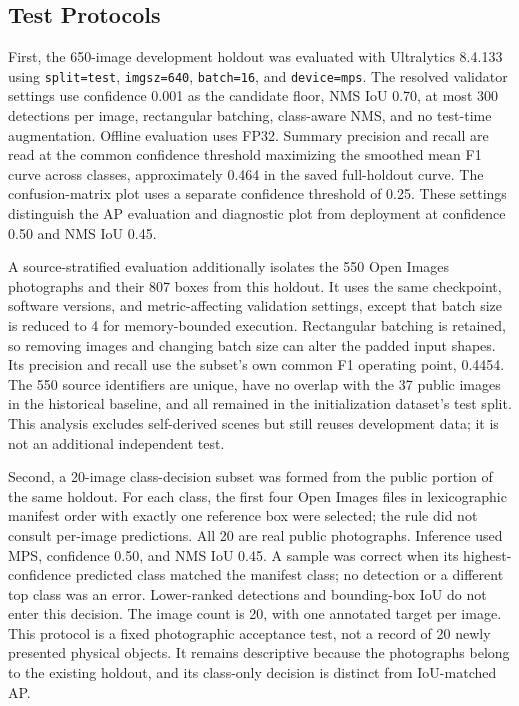\documentclass[12pt,a4paper]{article}
\begin{document}
\subsection{Test Protocols}

First, the 650-image development holdout was evaluated with Ultralytics 8.4.133 using \texttt{split=test}, \texttt{imgsz=640}, \texttt{batch=16}, and \texttt{device=mps}. The resolved validator settings use confidence 0.001 as the candidate floor, NMS IoU 0.70, at most 300 detections per image, rectangular batching, class-aware NMS, and no test-time augmentation. Offline evaluation uses FP32. Summary precision and recall are read at the common confidence threshold maximizing the smoothed mean F1 curve across classes, approximately 0.464 in the saved full-holdout curve. The confusion-matrix plot uses a separate confidence threshold of 0.25. These settings distinguish the AP evaluation and diagnostic plot from deployment at confidence 0.50 and NMS IoU 0.45.

A source-stratified evaluation additionally isolates the 550 Open Images photographs and their 807 boxes from this holdout. It uses the same checkpoint, software versions, and metric-affecting validation settings, except that batch size is reduced to 4 for memory-bounded execution. Rectangular batching is retained, so removing images and changing batch size can alter the padded input shapes. Its precision and recall use the subset's own common F1 operating point, 0.4454. The 550 source identifiers are unique, have no overlap with the 37 public images in the historical baseline, and all remained in the initialization dataset's test split. This analysis excludes self-derived scenes but still reuses development data; it is not an additional independent test.

Second, a 20-image class-decision subset was formed from the public portion of the same holdout. For each class, the first four Open Images files in lexicographic manifest order with exactly one reference box were selected; the rule did not consult per-image predictions. All 20 are real public photographs. Inference used MPS, confidence 0.50, and NMS IoU 0.45. A sample was correct when its highest-confidence predicted class matched the manifest class; no detection or a different top class was an error. Lower-ranked detections and bounding-box IoU do not enter this decision. The image count is 20, with one annotated target per image. This protocol is a fixed photographic acceptance test, not a record of 20 newly presented physical objects. It remains descriptive because the photographs belong to the existing holdout, and its class-only decision is distinct from IoU-matched AP.
\end{document}
